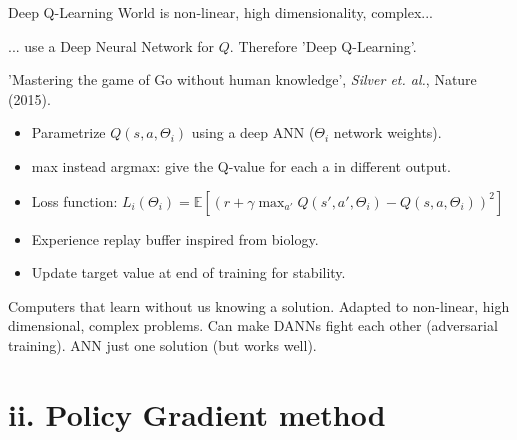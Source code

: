 \documentclass{beamer}
\begin{document}
\begin{frame}{Deep Q-Learning}
    World is non-linear, high dimensionality, complex...

    \begin{center}
      ... use a Deep Neural Network for $Q$. Therefore 'Deep Q-Learning'.
    \end{center}

    \begin{center}
      'Mastering the game of Go without human knowledge', \textit{Silver et. al.}, Nature (2015). \\
    \end{center}

    \begin{itemize}
      \item Parametrize $Q(s, a, \Theta_i)$ using a deep ANN ($\Theta_i$ network weights).
      \item max instead argmax: give the Q-value for each a in different output.
      \item Loss function: $L_i(\Theta_i) = \mathbb{E} \left[ \left( r + \gamma \max_{a'} Q(s', a', \Theta_i) - Q(s, a, \Theta_i) \right)^2 \right]$
      \item Experience replay buffer inspired from biology.
      \item Update target value at end of training for stability.
    \end{itemize}

   Computers that learn without us knowing a solution. Adapted to non-linear, high dimensional, complex problems. Can make DANNs fight each other (adversarial training). ANN just one solution (but works well).
\end{frame}

\section{ii. Policy Gradient method}
\end{document}
